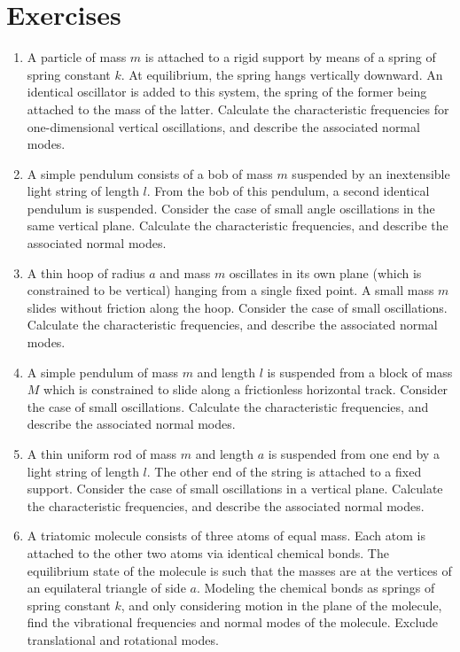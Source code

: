 \section{Exercises}
{\small
\renewcommand{\theenumi}{11.\arabic{enumi}}
\begin{enumerate}
\item A particle of mass $m$ is attached to a rigid support by means of a spring of
spring constant $k$. At equilibrium, the spring hangs vertically
downward. An identical oscillator is added to this system, the
spring of the former being attached to the mass of the latter.
Calculate the characteristic frequencies for one-dimensional vertical
oscillations, and describe the associated normal modes.
\item A simple pendulum consists of a bob of mass $m$ suspended
by an inextensible light string of length $l$. From the bob of
this pendulum, a second identical
pendulum is suspended. Consider the case of small angle oscillations
in the same vertical plane. Calculate the characteristic frequencies, and describe the associated normal modes.
\item A thin hoop of radius $a$ and mass $m$ oscillates in its
own plane (which is constrained to be vertical) hanging from a single fixed point. A small mass $m$ slides
without friction along the hoop. Consider the case of small oscillations.
Calculate the characteristic frequencies, and describe the associated normal modes.
\item A simple pendulum of mass $m$ and length $l$ is suspended from
 a block of mass $M$ which is constrained to slide along a frictionless
horizontal track. Consider the case of small oscillations. Calculate the characteristic frequencies, and describe the associated normal modes.
\item A thin uniform rod of mass $m$ and length $a$ is suspended from
one end by a light string of length $l$. The other end of the string
is attached to a fixed support. Consider the case of small oscillations
in a vertical plane. 
Calculate the characteristic frequencies, and describe the associated normal modes.
\item A triatomic molecule consists of three atoms of equal mass.
Each atom is attached to the other two atoms via identical chemical bonds.
The equilibrium state of the molecule is such that the masses are at the vertices of 
an equilateral triangle of side $a$. Modeling the chemical bonds as
springs of spring constant $k$, and only considering motion in the plane of the molecule, find the vibrational frequencies and normal modes of the molecule. Exclude translational and rotational modes. 
\end{enumerate}
}

